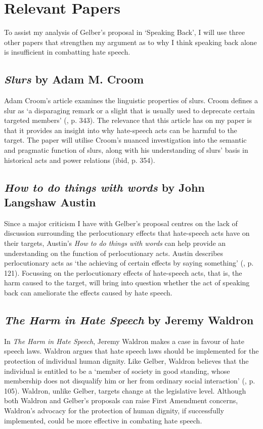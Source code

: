 \documentclass{article}
\begin{document}
\section{Relevant Papers}

To assist my analysis of Gelber’s proposal in ‘Speaking Back’, I will use three other papers that strengthen my argument as to why I think speaking back alone is insufficient in combatting hate speech.

\subsection*{\textit{Slurs} by Adam M. Croom}

Adam Croom’s article examines the linguistic properties of slurs. Croom defines a slur as ‘a disparaging remark or a slight that is usually used to deprecate certain targeted members' (\cite{croom}, p. 343). The relevance that this article has on my paper is that it provides an insight into why hate-speech acts can be harmful to the target. The paper will utilise Croom’s nuanced investigation into the semantic and pragmatic function of slurs, along with his understanding of slurs’ basis in historical acts and power relations (ibid, p. 354). 

\subsection*{\textit{How to do things with words} by John Langshaw Austin}

Since a major criticism I have with Gelber’s proposal centres on the lack of discussion surrounding the perlocutionary effects that hate-speech acts have on their targets, Austin’s \textit{How to do things with words} can help provide an understanding on the function of perlocutionary acts. Austin describes perlocutionary acts as ‘the achieving of certain effects by saying something’ (\cite{austin}, p. 121). Focussing on the perlocutionary effects of hate-speech acts, that is, the harm caused to the target, will bring into question whether the act of speaking back can ameliorate the effects caused by hate speech.

\subsection*{\textit{The Harm in Hate Speech} by Jeremy Waldron}

In \textit{The Harm in Hate Speech}, Jeremy Waldron makes a case in favour of hate speech laws. Waldron argues that hate speech laws should be implemented for the protection of individual human dignity. Like Gelber, Waldron believes that the individual is entitled to be a ‘member of society in good standing, whose membership does not disqualify him or her from ordinary social interaction' (\cite{waldron}, p. 105). Waldron, unlike Gelber, targets change at the legislative level. Although both Waldron and Gelber’s proposals can raise First Amendment concerns, Waldron’s advocacy for the protection of human dignity, if successfully implemented, could be more effective in combating hate speech. 

\newpage

\printbibliography
\end{document}
